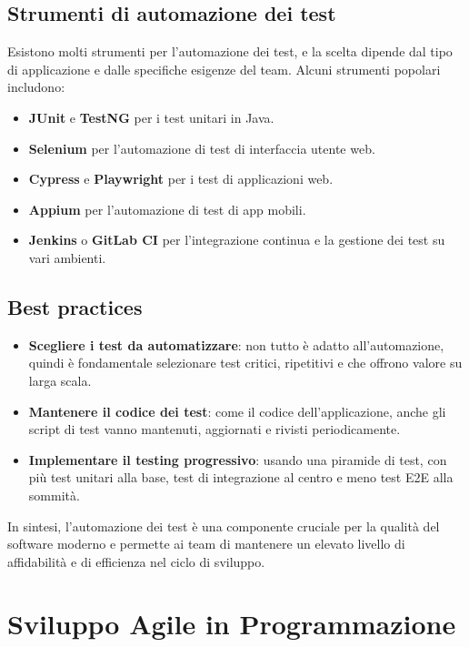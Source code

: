 \documentclass{article}
\begin{document}
\subsection{Strumenti di automazione dei test}
Esistono molti strumenti per l'automazione dei test, e la scelta dipende dal tipo di applicazione e dalle specifiche esigenze del team. Alcuni strumenti popolari includono:
\begin{itemize}
    \item \textbf{JUnit} e \textbf{TestNG} per i test unitari in Java.
    \item \textbf{Selenium} per l'automazione di test di interfaccia utente web.
    \item \textbf{Cypress} e \textbf{Playwright} per i test di applicazioni web.
    \item \textbf{Appium} per l’automazione di test di app mobili.
    \item \textbf{Jenkins} o \textbf{GitLab CI} per l'integrazione continua e la gestione dei test su vari ambienti.
\end{itemize}

\subsection{Best practices}
\begin{itemize}
    \item \textbf{Scegliere i test da automatizzare}: non tutto è adatto all’automazione, quindi è fondamentale selezionare test critici, ripetitivi e che offrono valore su larga scala.
    \item \textbf{Mantenere il codice dei test}: come il codice dell’applicazione, anche gli script di test vanno mantenuti, aggiornati e rivisti periodicamente.
    \item \textbf{Implementare il testing progressivo}: usando una piramide di test, con più test unitari alla base, test di integrazione al centro e meno test E2E alla sommità.
\end{itemize}

In sintesi, l’automazione dei test è una componente cruciale per la qualità del software moderno e permette ai team di mantenere un elevato livello di affidabilità e di efficienza nel ciclo di sviluppo.

\section{Sviluppo Agile in Programmazione}
\end{document}

